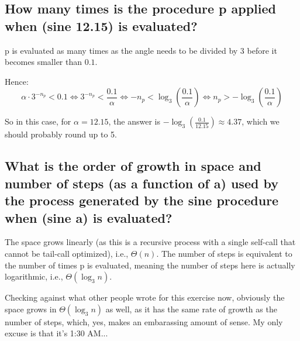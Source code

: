 \documentclass{sicp}
\date{August 17, 2024}
\begin{document}
\maketitle

\subsection*{How many times is the procedure p applied when (sine 12.15) is evaluated?}
p is evaluated as many times as the angle needs to be divided by 3 before it becomes smaller than $0.1$.

Hence:
\[
	\alpha \cdot 3^{-n_p} < 0.1 \Leftrightarrow 3^{-n_p} < \frac{0.1}{\alpha} \Leftrightarrow -n_p < \log_3\left(\frac{0.1}{\alpha}\right) \Leftrightarrow n_p > -\log_3\left(\frac{0.1}{\alpha}\right)
\]

So in this case, for $\alpha = 12.15$, the answer is $-\log_3(\frac{0.1}{12.15}) \approx 4.37$, which we should probably round up to 5.

\subsection*{What is the order of growth in space and number of steps (as a function of a) used by the process generated by the sine procedure when (sine a) is evaluated?}

The space grows linearly (as this is a recursive process with a single self-call that cannot be tail-call optimized), i.e., $\Theta(n)$.
The number of steps is equivalent to the number of times p is evaluated, meaning the number of steps here is actually logarithmic, i.e., $\Theta(\log_3 n)$.

Checking against what other people wrote for this exercise now, obviously the space grows in $\Theta(\log_3 n)$ as well, as it has the same rate of growth as the number of steps, which, yes, makes an embarassing amount of sense.
My only excuse is that it's 1:30 AM...
\end{document}
